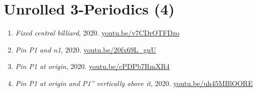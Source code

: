 \documentclass[12pt]{article}
\begin{document}
\section{Unrolled 3-Periodics (4)}

\begin{enumerate}[resume]
\item \textit{Fixed central billiard}, 2020. \href{https://youtu.be/v7CDrOTFDzo}{\url{youtu.be/v7CDrOTFDzo}}
\item \textit{Pin P1 and n1}, 2020. \href{https://youtu.be/20fx69L_gnU}{\url{youtu.be/20fx69L\_gnU}}
\item \textit{Pin P1 at origin}, 2020. \href{https://youtu.be/cPDPb7RmXR4}{\url{youtu.be/cPDPb7RmXR4}}
\item \textit{Pin P1 at origin and P1'' vertically above it}, 2020. \href{https://youtu.be/uh45MBlOORE}{\url{youtu.be/uh45MBlOORE}}
\end{enumerate}
\end{document}
